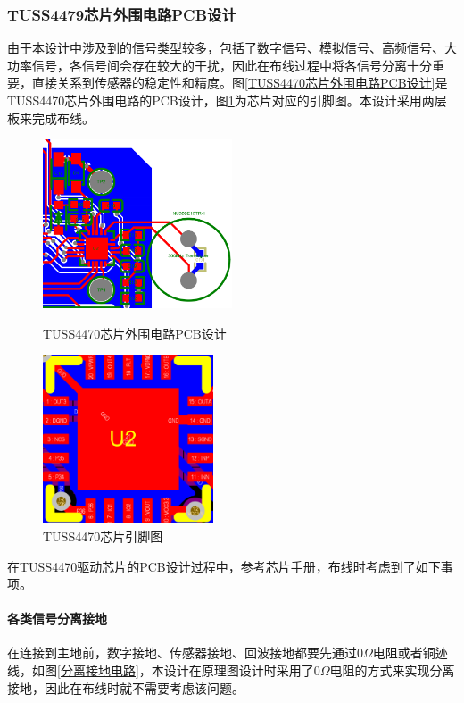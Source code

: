 \subsubsection{TUSS4479芯片外围电路PCB设计}
由于本设计中涉及到的信号类型较多，包括了数字信号、模拟信号、高频信号、大功率信号，各信号间会存在较大的干扰，因此在布线过程中将各信号分离十分重要，直接关系到传感器的稳定性和精度。图\ref{TUSS4470芯片外围电路PCB设计}是TUSS4470芯片外围电路的PCB设计，图\ref{TUSS4470芯片引脚图}为芯片对应的引脚图。本设计采用两层板来完成布线。
\begin{figure}[!h]
	\begin{minipage}[t]{0.5\linewidth}
		\centering
		\includegraphics[height=5cm]{figure/TUSS4470 pcb.png}
		\caption{TUSS4470芯片外围电路PCB设计}
		\label{TUSS4470芯片外围电路PCB设计}
	\end{minipage}
	\begin{minipage}[t]{0.5\linewidth}
		\centering
		\includegraphics[height=5cm]{figure/TUSS4470 PIN.png}
		\caption{TUSS4470芯片引脚图}
		\label{TUSS4470芯片引脚图}
	\end{minipage}  		 
\end{figure}\par
在TUSS4470驱动芯片的PCB设计过程中，参考芯片手册，布线时考虑到了如下事项。\par
\paragraph{各类信号分离接地}
在连接到主地前，数字接地、传感器接地、回波接地都要先通过0$\Omega$电阻或者铜迹线，如图\ref{分离接地电路}，本设计在原理图设计时采用了0$\Omega$电阻的方式来实现分离接地，因此在布线时就不需要考虑该问题。
